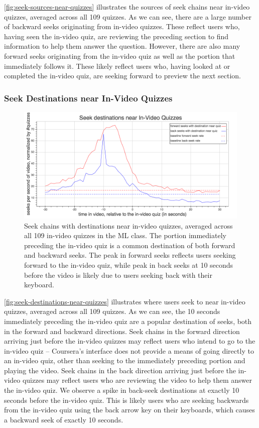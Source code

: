 \documentclass{sigchi}
\begin{document}
\autoref{fig:seek-sources-near-quizzes} illustrates the sources of seek chains near in-video quizzes, averaged across all 109 quizzes. As we can see, there are a large number of backward seeks originating from in-video quizzes. These reflect users who, having seen the in-video quiz, are reviewing the preceding section to find information to help them answer the question. However, there are also many forward seeks originating from the in-video quiz as well as the portion that immediately follows it. These likely reflect users who, having looked at or completed the in-video quiz, are seeking forward to preview the next section.

\subsubsection{Seek Destinations near In-Video Quizzes}

\begin{figure}
\includegraphics[width=1.0\columnwidth]{seek-destinations-near-quizzes}
\caption{Seek chains with destinations near in-video quizzes, averaged across all 109 in-video quizzes in the ML class. The portion immediately preceding the in-video quiz is a common destination of both forward and backward seeks. The peak in forward seeks reflects users seeking forward to the in-video quiz, while peak in back seeks at 10 seconds before the video is likely due to users seeking back with their keyboard.}
\label{fig:seek-destinations-near-quizzes}
\end{figure}

\autoref{fig:seek-destinations-near-quizzes} illustrates where users seek to near in-video quizzes, averaged across all 109 quizzes. As we can see, the 10 seconds immediately preceding the in-video quiz are a popular destination of seeks, both in the forward and backward directions. Seek chains in the forward direction arriving just before the in-video quizzes may reflect users who intend to go to the in-video quiz -- Coursera's interface does not provide a means of going directly to an in-video quiz, other than seeking to the immediately preceding portion and playing the video. Seek chains in the back direction arriving just before the in-video quizzes may reflect users who are reviewing the video to help them answer the in-video quiz. We observe a spike in back-seek destinations at exactly 10 seconds before the in-video quiz. This is likely users who are seeking backwards from the in-video quiz using the back arrow key on their keyboards, which causes a backward seek of exactly 10 seconds.
\end{document}
